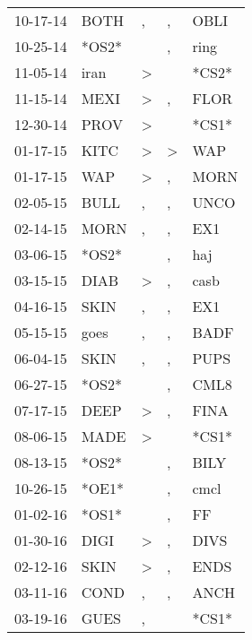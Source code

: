 \begin{supertabular}{lllll}
 10-17-14 &   BOTH &                , &                , &   OBLI \\
 10-25-14 &  *OS2* &                  &                , &   ring \\
 11-05-14 &   iran &     \textgreater &                  &  *CS2* \\
 11-15-14 &   MEXI &     \textgreater &                , &   FLOR \\
 12-30-14 &   PROV &     \textgreater &                  &  *CS1* \\
 01-17-15 &   KITC &     \textgreater &     \textgreater &    WAP \\
 01-17-15 &    WAP &     \textgreater &                , &   MORN \\
 02-05-15 &   BULL &                , &                , &   UNCO \\
 02-14-15 &   MORN &                , &                , &    EX1 \\
 03-06-15 &  *OS2* &                  &                , &    haj \\
 03-15-15 &   DIAB &     \textgreater &                , &   casb \\
 04-16-15 &   SKIN &                , &                , &    EX1 \\
 05-15-15 &   goes &                , &                , &   BADF \\
 06-04-15 &   SKIN &                , &                , &   PUPS \\
 06-27-15 &  *OS2* &                  &                , &   CML8 \\
 07-17-15 &   DEEP &     \textgreater &                , &   FINA \\
 08-06-15 &   MADE &     \textgreater &                  &  *CS1* \\
 08-13-15 &  *OS2* &                  &                , &   BILY \\
 10-26-15 &  *OE1* &                  &                , &   cmcl \\
 01-02-16 &  *OS1* &                  &                , &     FF \\
 01-30-16 &   DIGI &     \textgreater &                , &   DIVS \\
 02-12-16 &   SKIN &     \textgreater &                , &   ENDS \\
 03-11-16 &   COND &                , &                , &   ANCH \\
 03-19-16 &   GUES &                , &                  &  *CS1* \\

\end{supertabular}
